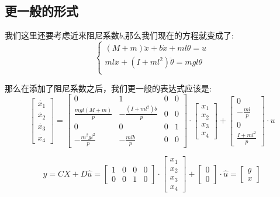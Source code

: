\documentclass{article}
\begin{document}
\subsection*{更一般的形式}
我们这里还要考虑近来阻尼系数$b$,那么我们现在的方程就变成了:
\[
\left\{\begin{matrix}
    (M+m)\ddot{x}+b\dot{x}+ml\ddot{\theta} = u \\
    ml\ddot{x}+(I+ml^2)\ddot{\theta} = mgl\theta \\
\end{matrix}
\right.
\]

那么在添加了阻尼系数之后，我们更一般的表达式应该是:
\[
\begin{bmatrix}
\dot{x_1}\\\dot{x_2}\\\dot{x_3}\\\dot{x_4}    
\end{bmatrix}
=
\begin{bmatrix}
0&1&0&0\\
\frac{mgl(M+m)}{p}&-\frac{(I+ml^2)b}{p}&0&0\\
0&0&0&1\\
-\frac{m^2gl^2}{p}&-\frac{mlb}{p}&0&0
\end{bmatrix}\cdot
\begin{bmatrix}
    x_1\\x_2\\x_3\\x_4
\end{bmatrix} + 
\begin{bmatrix}
0\\
-\frac{ml}{p}\\
0\\
\frac{I+ml^2}{p}
\end{bmatrix}\cdot u 
\]

\[
y=CX+D\hat{u}=\begin{bmatrix}
    1&0&0&0\\
    0&0&1&0
\end{bmatrix} \cdot
\begin{bmatrix}
    x_1\\x_2\\x_3\\x_4
\end{bmatrix}+\begin{bmatrix}
    0\\0
\end{bmatrix}\cdot \hat{u}=
\begin{bmatrix}
   \theta \\ x
\end{bmatrix}
\]
\end{document}
